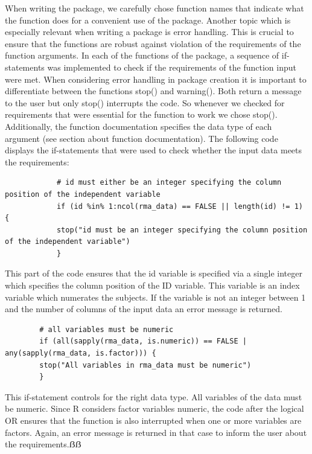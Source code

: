 \documentclass[11pt]{article}
\begin{document}
		When writing the package, we carefully chose function names that indicate what the function does for a convenient use of the package. Another topic which is especially relevant when writing a package is error handling. This is crucial to ensure that the functions are robust against violation of the requirements of the function arguments. In each of the functions of the package, a sequence of if-statements was implemented to check if the requirements of the function input were met. When considering error handling in package creation it is important to differentiate between the functions stop() and warning(). Both return a message to the user but only stop() interrupts the code. So whenever we checked for requirements that were essential for the function to work we chose stop(). Additionally, the function documentation specifies the data type of each argument (see section about function documentation).
		The following code displays the if-statements that were used to check whether the input data meets the requirements:\\
		
		\begin{lstlisting}
			# id must either be an integer specifying the column position of the independent variable
			if (id %in% 1:ncol(rma_data) == FALSE || length(id) != 1) {
			stop("id must be an integer specifying the column position of the independent variable")
			}
		\end{lstlisting}
		
		This part of the code ensures that the id variable is specified via a single integer which specifies the column position of the ID variable. This variable is an index variable which numerates the subjects. If the variable is not an integer between 1 and the number of columns of the input data an error message is returned.\\
		
		\begin{lstlisting}
		# all variables must be numeric
		if (all(sapply(rma_data, is.numeric)) == FALSE | any(sapply(rma_data, is.factor))) {
		stop("All variables in rma_data must be numeric")
		}
		\end{lstlisting}
		
		This if-statement controls for the right data type. All variables of the data must be numeric. Since R considers factor variables numeric, the code after the logical OR ensures that the function is also interrupted when one or more variables are factors. Again, an error message is returned in that case to inform the user about the requirements.ẞẞ
		
\end{document}
